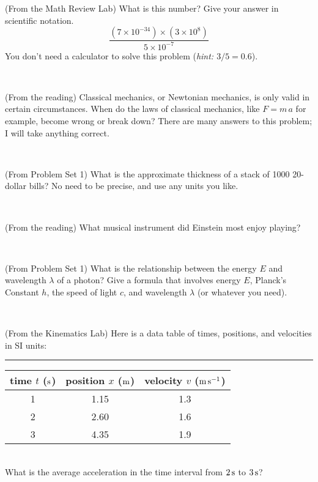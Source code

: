 \documentclass[12pt, letterpaper]{article}
\begin{document}
\begin{problem} (From the Math Review Lab)
What is this number? Give your answer in scientific notation.
$$
\frac{(7\times10^{-34})\times(3\times10^8)}{5\times10^{-7}}
$$
You don't need a calculator to solve this problem (\textit{hint: $3/5=0.6$}).
\end{problem}


\vfill ~

\begin{problem} (From the reading)
Classical mechanics, or Newtonian mechanics, is only valid in certain
circumstances. When do the laws of classical mechanics, like $F =
m\,a$ for example, become wrong or break down? There are many answers
to this problem; I will take anything correct.
\end{problem}


\vfill ~

\begin{problem} (From Problem Set 1)
What is the approximate thickness of a stack of 1000 20-dollar bills?
No need to be precise, and use any units you like.
\end{problem}


\vfill ~

\begin{problem} (From the reading)
What musical instrument did Einstein most enjoy playing?
\end{problem}


\vfill ~


\clearpage


\begin{problem} (From Problem Set 1)
What is the relationship between the energy $E$ and wavelength
$\lambda$ of a photon? Give a formula that involves energy $E$,
Planck's Constant $h$, the speed of light $c$, and wavelength
$\lambda$ (or whatever you need).
\end{problem}

\vfill ~

\begin{problem} (From the Kinematics Lab)
Here is a data table of times, positions, and velocities in SI units:\\
\rule{1.0in}{0pt}\begin{tabular}{c|c|c}
time $t$ ($\mathrm{s}$) & position $x$ ($\mathrm{m}$) & velocity $v$ ($\mathrm{m}\,\mathrm{s}^{-1}$) \\
\hline
1 & 1.15 & 1.3 \\
2 & 2.60 & 1.6 \\
3 & 4.35 & 1.9 \\
\hline
\end{tabular}\\
What is the average acceleration in the time interval from $2\,\mathrm{s}$ to $3\,\mathrm{s}$?
\end{problem}
\end{document}
